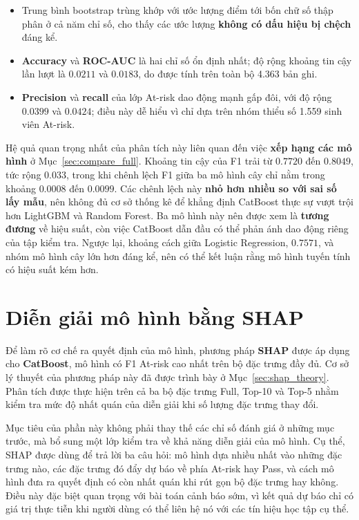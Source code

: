 \documentclass[a4paper]{report}
\begin{document}
\begin{itemize}[leftmargin=*]
  \item Trung bình bootstrap trùng khớp với ước lượng điểm tới bốn chữ số thập
        phân ở cả năm chỉ số, cho thấy các ước lượng \textbf{không có dấu hiệu
        bị chệch} đáng kể.
  \item \textbf{Accuracy} và \textbf{ROC-AUC} là hai chỉ số ổn định nhất; độ
        rộng khoảng tin cậy lần lượt là $0.0211$ và $0.0183$, do được tính trên
        toàn bộ 4.363 bản ghi.
  \item \textbf{Precision} và \textbf{recall} của lớp At-risk dao động mạnh
        gấp đôi, với độ rộng $0.0399$ và $0.0424$; điều này dễ hiểu vì chỉ dựa trên
        nhóm thiểu số 1.559 sinh viên At-risk.
\end{itemize}

Hệ quả quan trọng nhất của phân tích này liên quan đến việc \textbf{xếp hạng
các mô hình} ở Mục~\ref{sec:compare_full}. Khoảng tin cậy của F1 trải từ
$0.7720$ đến $0.8049$, tức rộng $0.033$, trong khi chênh lệch F1 giữa ba mô
hình cây chỉ nằm trong khoảng $0.0008$ đến $0.0099$. Các chênh lệch này
\textbf{nhỏ hơn nhiều so với sai số lấy mẫu}, nên không đủ cơ sở thống kê để
khẳng định CatBoost thực sự vượt trội hơn LightGBM và Random Forest. Ba mô
hình này nên được xem là \textbf{tương đương} về hiệu suất, còn việc CatBoost
dẫn đầu có thể phản ánh dao động riêng của tập kiểm tra. Ngược lại, khoảng
cách giữa Logistic Regression, $0.7571$, và nhóm mô hình cây lớn hơn đáng kể,
nên có thể kết luận rằng mô hình tuyến tính có hiệu suất kém hơn.


\section{Diễn giải mô hình bằng SHAP}

Để làm rõ cơ chế ra quyết định của mô hình, phương pháp \textbf{SHAP} được áp
dụng cho \textbf{CatBoost}, mô hình có F1 At-risk cao nhất trên bộ đặc trưng
đầy đủ. Cơ sở lý thuyết của phương pháp này đã được trình bày ở
Mục~\ref{sec:shap_theory}. Phân tích được thực hiện trên cả ba bộ đặc trưng
Full, Top-10 và Top-5 nhằm kiểm tra mức độ nhất quán của diễn giải khi số lượng
đặc trưng thay đổi.

Mục tiêu của phần này không phải thay thế các chỉ số đánh giá ở những mục
trước, mà bổ sung một lớp kiểm tra về khả năng diễn giải của mô hình. Cụ thể,
SHAP được dùng để trả lời ba câu hỏi: mô hình dựa nhiều nhất vào những đặc
trưng nào, các đặc trưng đó đẩy dự báo về phía At-risk hay Pass, và cách mô
hình đưa ra quyết định có còn nhất quán khi rút gọn bộ đặc trưng hay không.
Điều này đặc biệt quan trọng với bài toán cảnh báo sớm, vì kết quả dự báo chỉ
có giá trị thực tiễn khi người dùng có thể liên hệ nó với các tín hiệu học tập
cụ thể.
\end{document}
